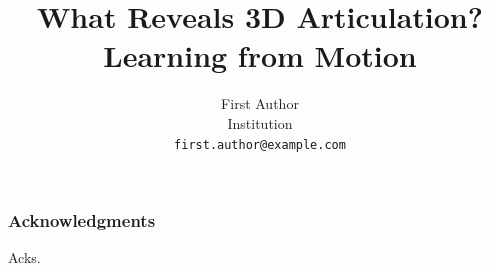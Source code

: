 \documentclass{article}
\title{What Reveals 3D Articulation? Learning from Motion}
\author{%
  First Author \\
  Institution \\
  \texttt{first.author@example.com}
}
\begin{document}
\maketitle












\ificlrfinal
\subsubsection*{Acknowledgments}
Acks.
\fi




\appendix

\end{document}
